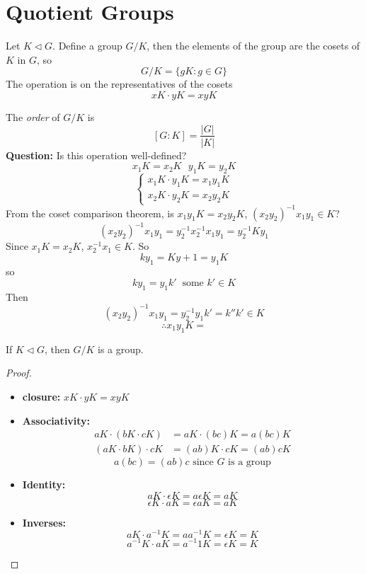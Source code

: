 \documentclass[openany]{report}
\begin{document}
\section{Quotient Groups}
\begin{definition}
    Let $K \triangleleft G$. Define a group $G/K$, then the elements of the group are the cosets of $K$ in $G$, so 
    \[G/K = \{gK : g \in G\}\]
    The operation is on the representatives of the cosets
    \[xK \cdot yK = xyK\]
\end{definition}
\noindent
The \emph{order} of $G / K$ is 
\[[G:K] = \frac{|G|}{|K|}\]
\textbf{Question:} Is this operation well-defined? 
\[x_1K = x_2K \ \ \ y_1K = y_2K\]
\[\begin{cases}
    x_1K \cdot y_1K = x_1y_1K\\
    x_2K \cdot y_2K = x_2y_2K
\end{cases}\]
From the coset comparison theorem, is $x_1y_1K = x_2y_2K$, $(x_2y_2)^{-1}x_1y_1 \in K$?
\[(x_2y_2)^{-1}x_1y_1 = y_2^{-1}x_2^{-1}x_1y_1 = y_2^{-1}Ky_1\]
Since $x_1K = x_2K$, $x_2^{-1}x_1 \in K$. So
\[ky_1 = Ky+1 = y_1K\]
so 
\[ky_1 = y_1k' \ \text{ some } k' \in K\]
Then 
\[(x_2y_2)^{-1}x_1y_1 = y_2^{-1}y_1k' = k''k' \in K\]
\[\therefore x_1y_1K = \]
\begin{theorem}
    If $K \triangleleft G$, then $G / K$ is a group.
\end{theorem}
\begin{proof}
    \begin{itemize}
        \item \textbf{closure:} $xK \cdot yK = xyK$
        \item \textbf{Associativity:}
        \begin{align*}
            aK \cdot (bK \cdot cK) &= aK \cdot (bc)K = a(bc)K\\
            (aK \cdot bK) \cdot cK &= (ab)K \cdot cK = (ab)cK
        \end{align*} 
        \[a(bc) = (ab)c \text{ since $G$ is a group}\]
        \item \textbf{Identity:} 
        \[aK \cdot \epsilon K = a\epsilon K = a K\]
        \[\epsilon K \cdot aK = \epsilon aK = a K\]
        \item \textbf{Inverses:}
        \[aK \cdot a^{-1}K = aa^{-1}K = \epsilon K = K\]
        \[a^{-1}K \cdot aK =a^{-1}1K = \epsilon K = K \]
    \end{itemize}
\end{proof}

\end{document}
